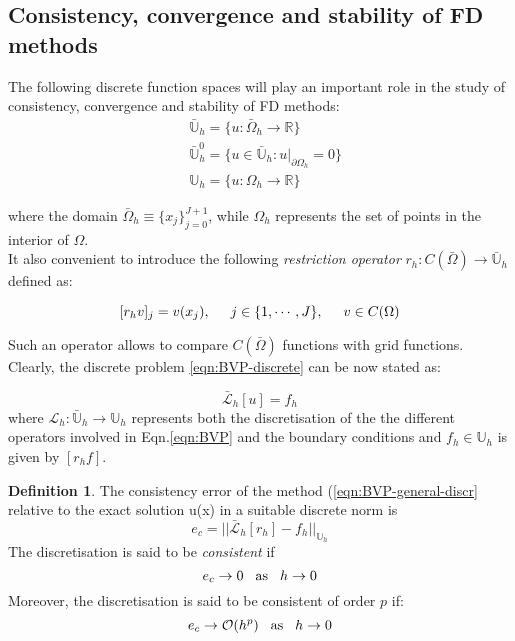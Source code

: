 \documentclass[11pt]{article}
\theoremstyle{theorem}
\theoremstyle{definition}
\newtheorem{definition}{Definition}
\begin{document}
\subsection{Consistency, convergence and stability of FD methods}
The following discrete function spaces will play an important role in the study of consistency, convergence and stability of FD methods:
\begin{align*}
	&\bar{\mathbb{U}}_h=\lbrace u:\bar{\Omega}_h\rightarrow\mathbb{R}\rbrace\\
	&\bar{\mathbb{U}}^0_h=\lbrace u\in\bar{\mathbb{U}}_h : u|_{\partial\Omega_h}=0\rbrace\\
	&{\mathbb{U}}_h=\lbrace u:\Omega_h\rightarrow\mathbb{R}\rbrace
\end{align*}

where the domain $\bar{\Omega}_h\equiv\lbrace x_j\rbrace_{j=0}^{J+1}$, while $\Omega_h$ represents the set of points in the interior of $\Omega$.\\
It also convenient to introduce the following \emph{restriction operator} $r_h:C(\bar{\Omega})\rightarrow\bar{\mathbb{U}}_h$ defined as:

$$[r_h v]_j=v(x_j),\hspace{5mm}j\in\lbrace 1, \cdots, J\rbrace,\hspace{5mm} v\in C(\Omega)$$

Such an operator allows to compare $C(\bar{\Omega})$ functions with grid functions.\\

Clearly, the discrete problem \eqref{eqn:BVP-discrete} can be now stated as:

\begin{equation}
	\label{eqn:BVP-general-discr}
\end{equation}
$$\bar{\mathcal{L}}_h[u]=f_h$$
where $\mathcal{L}_h:\bar{\mathbb{U}}_h\rightarrow\mathbb{U}_h$ represents both the discretisation of the the different operators involved in Eqn.\eqref{eqn:BVP} and the boundary conditions and $f_h\in\mathbb{U}_h$ is given by $[r_hf]$.\\

\begin{definition}
	\label{defn:consistency}
	The consistency error of the method (\eqref{eqn:BVP-general-discr} relative to the exact solution u(x) in a suitable discrete norm is
	$$e_c=||\bar{\mathcal{L}}_h[r_h]-f_h||_{\mathbb{U}_h} $$
	The discretisation is said to be \emph{consistent} if 
	\begin{equation}
		\label{eqn:consistent}
		e_c\rightarrow 0\hspace{3mm}\text{as}\hspace{3mm}h\rightarrow 0
	\end{equation}
	Moreover, the discretisation is said to be consistent of order $p$ if:
	\begin{equation}
	\label{eqn:consistent-p}
	e_c\rightarrow\mathcal{O}(h^p)\hspace{3mm}\text{as}\hspace{3mm}h\rightarrow 0
	\end{equation}
\end{definition}
\end{document}
